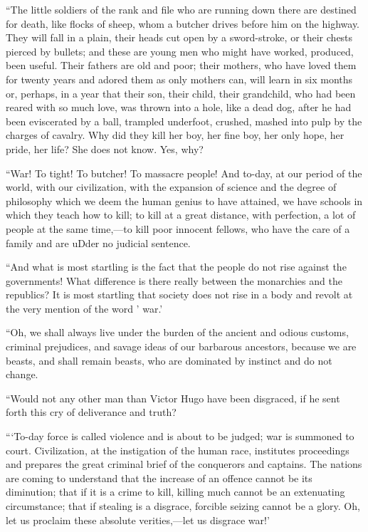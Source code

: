 \documentclass{book}
\begin{document}
“The little soldiers of the rank and file who are running down there are destined for death, like flocks of sheep, whom a butcher drives before him on the highway. They will fall in a plain, their heads cut open by a sword-stroke, or their chests pierced by bullets; and these are young men who might have worked, produced, been useful. Their fathers are old and poor; their mothers, who have loved them for twenty years and adored them as only mothers can, will learn in six months or, perhaps, in a year that their son, their child, their grandchild, who had been reared with so much love, was thrown into a hole, like a dead dog, after he had been eviscerated by a ball, trampled underfoot, crushed, mashed into pulp by the charges of cavalry. Why did they kill her boy, her fine boy, her only hope, her pride, her life? She does not know. Yes, why?

“War! To tight! To butcher! To massacre people! And to-day, at our period of the world, with our civilization, with the expansion of science and the degree of philosophy which we deem the human genius to have attained, we have schools in which they teach how to kill; to kill at a great distance, with perfection, a lot of people at the same time,—to kill poor innocent fellows, who have the care of a family and are uDder no judicial sentence.

“And what is most startling is the fact that the people do not rise against the governments! What difference is there really between the monarchies and the republics? It is most startling that society does not rise in a body and revolt at the very mention of the word ' war.’

“Oh, we shall always live under the burden of the ancient and odious customs, criminal prejudices, and savage ideas of our barbarous ancestors, because we are beasts, and shall remain beasts, who are dominated by instinct and do not change.

“Would not any other man than Victor Hugo have been disgraced, if he sent forth this cry of deliverance and truth?

“‘To-day force is called violence and is about to be judged; war is summoned to court. Civilization, at the instigation of the human race, institutes proceedings and prepares the great criminal brief of the conquerors and captains. The nations are coming to understand that the increase of an offence cannot be its diminution; that if it is a crime to kill, killing much cannot be an extenuating circumstance; that if stealing is a disgrace, forcible seizing cannot be a glory. Oh, let us proclaim these absolute verities,—let us disgrace war!’
\end{document}
